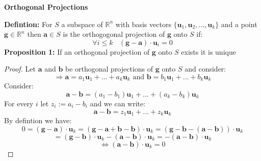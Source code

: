 \documentclass[12pt,leqno]{amsart}
\begin{document}
 \bigskip
 \centerline{\bf{Orthogonal Projections}}

 \bigskip

 {\bf Defintion:} For $S$ a subspace of $\mathbb{R}^n$ with basis vectors $\{\mathbf{u}_1, \mathbf{u}_2, \dots, \mathbf{u}_k\}$ and a point $\mathbf{g} \in \mathbb{R}^n$ then $\mathbf{a} \in S$ is the orthogogonal projection of $\mathbf{g}$ onto $S$ if:
 $$\forall i\leq k\ \  \ \ (\mathbf{g} - \mathbf{a})\cdot\mathbf{u}_i = 0 $$
 \medskip
{\bf Proposition 1: } If an orthogonal projection of $\mathbf{g}$ onto $S$ exists it is unique
\begin{proof} Let $\mathbf{a}$ and $\mathbf{b}$ be orthogonal projections of $\mathbf{g}$ onto $S$ and consider:
$$\Rightarrow \mathbf{a} = a_1\mathbf{u}_1 + \dots + a_k\mathbf{u}_k  \text{  and  } \mathbf{b} = b_1\mathbf{u}_1 + \dots + b_k\mathbf{u}_k $$
Consider:
$$\mathbf{a} - \mathbf{b} = (a_1 - b_1)\mathbf{u}_1 + \dots + (a_k - b_k)\mathbf{u}_k$$
For every $i$ let $z_i := a_i - b_i$ and we can write:
$$\mathbf{a} - \mathbf{b} = z_1\mathbf{u}_1 + \dots + z_k\mathbf{u}_k$$
By defintion we have: 
$$0 = (\mathbf{g} - \mathbf{a})\cdot\mathbf{u}_k = (\mathbf{g} - \mathbf{a} + \mathbf{b} - \mathbf{b})\cdot\mathbf{u}_k = (\mathbf{g} - \mathbf{b} - (\mathbf{a} - \mathbf{b}) )\cdot\mathbf{u}_k $$
$$= (\mathbf{g} - \mathbf{b})\cdot\mathbf{u}_k - (\mathbf{a} -\mathbf{b})\cdot\mathbf{u}_k = - (\mathbf{a} -\mathbf{b})\cdot\mathbf{u}_k $$ 
$$\iff (\mathbf{a} -\mathbf{b})\cdot\mathbf{u}_k = 0$$
\end{proof}
\end{document}
